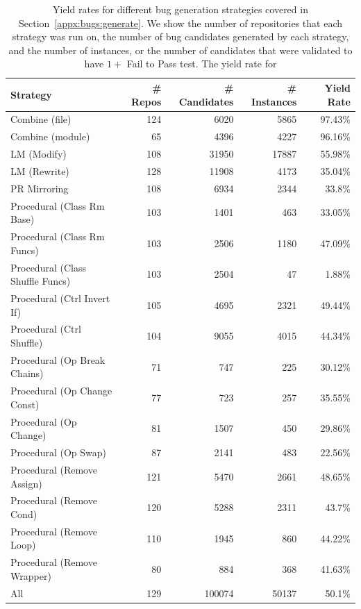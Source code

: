 \begin{table}[h]
    \centering
    \begin{tabular}{l|rrrr}
\toprule
Strategy & \# Repos & \# Candidates & \# Instances & Yield Rate \\
\midrule
Combine (file) & 124 & 6020 & 5865 & 97.43\% \\
Combine (module) & 65 & 4396 & 4227 & 96.16\% \\
LM (Modify) & 108 & 31950 & 17887 & 55.98\% \\
LM (Rewrite) & 128 & 11908 & 4173 & 35.04\% \\
PR Mirroring & 108 & 6934 & 2344 & 33.8\% \\
Procedural (Class Rm Base) & 103 & 1401 & 463 & 33.05\% \\
Procedural (Class Rm Funcs) & 103 & 2506 & 1180 & 47.09\% \\
Procedural (Class Shuffle Funcs) & 103 & 2504 & 47 & 1.88\% \\
Procedural (Ctrl Invert If) & 105 & 4695 & 2321 & 49.44\% \\
Procedural (Ctrl Shuffle) & 104 & 9055 & 4015 & 44.34\% \\
Procedural (Op Break Chains) & 71 & 747 & 225 & 30.12\% \\
Procedural (Op Change Const) & 77 & 723 & 257 & 35.55\% \\
Procedural (Op Change) & 81 & 1507 & 450 & 29.86\% \\
Procedural (Op Swap) & 87 & 2141 & 483 & 22.56\% \\
Procedural (Remove Assign) & 121 & 5470 & 2661 & 48.65\% \\
Procedural (Remove Cond) & 120 & 5288 & 2311 & 43.7\% \\
Procedural (Remove Loop) & 110 & 1945 & 860 & 44.22\% \\
Procedural (Remove Wrapper) & 80 & 884 & 368 & 41.63\% \\
\midrule
All & 129 & 100074 & 50137 & 50.1\% \\
\bottomrule
    \end{tabular}
    \caption{
    Yield rates for different bug generation strategies covered in Section~\ref{appx:bugs:generate}.
    We show the number of repositories that each strategy was run on, the number of bug candidates generated by each strategy, and the number of instances, or the number of candidates that were validated to have $1+$ Fail to Pass test.
    The yield rate for 
    }
    \label{tab:per_bug_type_yield_rate}
\end{table}